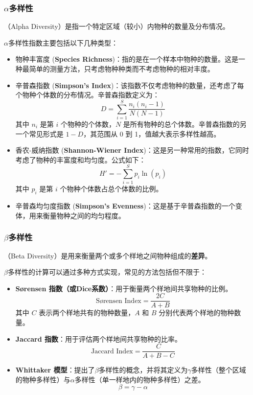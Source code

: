 \subsubsection{$\alpha$多样性}

（Alpha Diversity）是指一个特定区域（较小）内物种的数量及分布情况。

$\alpha$多样性指数主要包括以下几种类型：

\begin{itemize}
	\item 物种丰富度 (\textbf{Species Richness})：指的是在一个样本中物种的数量。这是一种最简单的测量方法，只考虑物种种类而不考虑物种的相对丰度。

	\item 辛普森指数 (\textbf{Simpson's Index})：该指数不仅考虑物种的数量，还考虑了每个物种个体数的分布情况。辛普森指数定义为：
	\[
	D = \sum_{i=1}^{S} \frac{n_i(n_i - 1)}{N(N-1)}
	\]
	其中 \( n_i \) 是第 \( i \) 个物种的个体数，\( N \) 是所有物种的总个体数。辛普森指数的另一个常见形式是 \( 1 - D \)，其范围从 0 到 1，值越大表示多样性越高。

	\item 香农-威纳指数 (\textbf{Shannon-Wiener Index})：这是另一种常用的指数，它同时考虑了物种的丰富度和均匀度。公式如下：
	\[
	H' = -\sum_{i=1}^{S} p_i \ln(p_i)
	\]
	其中 \( p_i \) 是第 \( i \) 个物种个体数占总个体数的比例。

	\item 辛普森均匀度指数 (\textbf{Simpson's Evenness})：这是基于辛普森指数的一个变体，用来衡量物种之间的均匀程度。
\end{itemize}

\subsubsection{$\beta$多样性}

（Beta Diversity）是用来衡量两个或多个样地之间物种组成的\textbf{差异}。

$\beta$多样性的计算可以通过多种方式实现，常见的方法包括但不限于：

\begin{itemize}
	\item \textbf{Sørensen 指数（或Dice系数）}：用于衡量两个样地间共享物种的比例。
	\[
	\textrm{Sørensen Index} = \frac{2C}{A + B}
	\]
	其中 \( C \) 表示两个样地共有的物种数量，\( A \) 和 \( B \) 分别代表两个样地的物种数量。

	\item \textbf{Jaccard 指数}：用于评估两个样地间共享物种的比率。
	\[
	\textrm{Jaccard Index} = \frac{C}{A + B - C}
	\]

	\item \textbf{Whittaker 模型}：提出了$\beta$多样性的概念，并将其定义为$\gamma$多样性（整个区域的物种多样性）与$\alpha$多样性（单一样地内的物种多样性）之差。
	\[
	\beta = \gamma - \alpha
	\]
\end{itemize}

